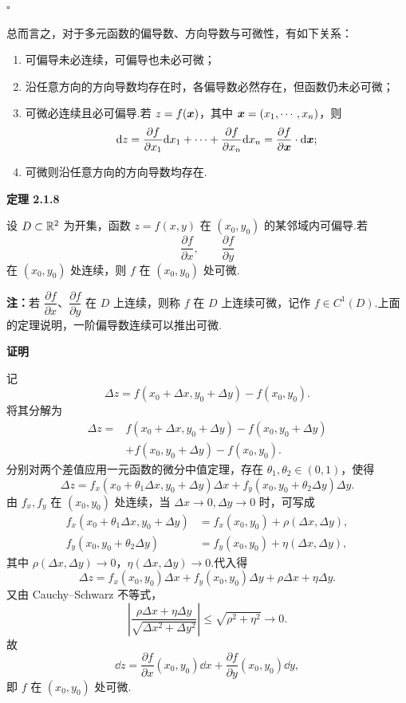 $\square$



总而言之，对于多元函数的偏导数、方向导数与可微性，有如下关系：
\begin{enumerate}
	\item 可偏导未必连续，可偏导也未必可微；
	\item 沿任意方向的方向导数均存在时，各偏导数必然存在，但函数仍未必可微；
	\item 可微必连续且必可偏导.若 $z=f(\boldsymbol{x})$，其中
	$\boldsymbol{x}=(x_1,\cdots,x_n)$，则
	\[
	\mathrm{d} z
	=
	\frac{\partial f}{\partial x_1}\mathrm{d} x_1
	+\cdots+
	\frac{\partial f}{\partial x_n}\mathrm{d} x_n
	=
	\frac{\partial f}{\partial\boldsymbol{x}}\cdot\mathrm{d}\boldsymbol{x};
	\]
	\item 可微则沿任意方向的方向导数均存在.
\end{enumerate}



\textbf{定理 2.1.8}

设 $D\subset\mathbb{R}^2$ 为开集，函数 $z=f(x,y)$ 在 $(x_0,y_0)$ 的某邻域内可偏导.若
	\[
	\frac{\partial f}{\partial x},\qquad
	\frac{\partial f}{\partial y}
	\]
	在 $(x_0,y_0)$ 处连续，则 $f$ 在 $(x_0,y_0)$ 处可微.




\textbf{注：}若 $\dfrac{\partial f}{\partial x}$、$\dfrac{\partial f}{\partial y}$ 在 $D$ 上连续，则称 $f$ 在 $D$ 上连续可微，记作 $f\in C^1(D)$.上面的定理说明，一阶偏导数连续可以推出可微.



\textbf{证明}

记
	\[
	\Delta z=f(x_0+\Delta x,y_0+\Delta y)-f(x_0,y_0).
	\]
	将其分解为
	\[
	\begin{aligned}
	\Delta z
	={}&f(x_0+\Delta x,y_0+\Delta y)-f(x_0,y_0+\Delta y)\\
	&+f(x_0,y_0+\Delta y)-f(x_0,y_0).
	\end{aligned}
	\]
	分别对两个差值应用一元函数的微分中值定理，存在
	$\theta_1,\theta_2\in(0,1)$，使得
	\[
	\Delta z
	=
	f_x(x_0+\theta_1\Delta x,y_0+\Delta y)\Delta x
	+
	f_y(x_0,y_0+\theta_2\Delta y)\Delta y.
	\]
	由 $f_x,f_y$ 在 $(x_0,y_0)$ 处连续，当
	$\Delta x\to0,\Delta y\to0$ 时，可写成
	\[
	\begin{aligned}
	f_x(x_0+\theta_1\Delta x,y_0+\Delta y)
		&=f_x(x_0,y_0)+\rho(\Delta x,\Delta y),\\
	f_y(x_0,y_0+\theta_2\Delta y)
		&=f_y(x_0,y_0)+\eta(\Delta x,\Delta y),
	\end{aligned}
	\]
	其中 $\rho(\Delta x,\Delta y)\to0$，$\eta(\Delta x,\Delta y)\to0$.代入得
	\[
	\Delta z
	=
	f_x(x_0,y_0)\Delta x+f_y(x_0,y_0)\Delta y
	+\rho\Delta x+\eta\Delta y.
	\]
	又由 Cauchy--Schwarz 不等式，
	\[
	\left|
	\frac{\rho\Delta x+\eta\Delta y}
	{\sqrt{\Delta x^2+\Delta y^2}}
	\right|
	\leq
	\sqrt{\rho^2+\eta^2}\longrightarrow0.
	\]
	故
	\[
	\dd z
	=
	\frac{\partial f}{\partial x}(x_0,y_0)\dd x
	+
	\frac{\partial f}{\partial y}(x_0,y_0)\dd y,
	\]
	即 $f$ 在 $(x_0,y_0)$ 处可微.


